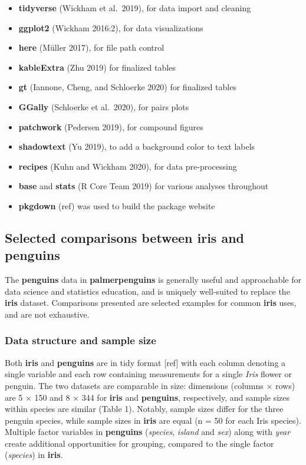 \begin{itemize}
\tightlist
\item
  \textbf{tidyverse} (Wickham et al.~2019), for data import and cleaning
\item
  \textbf{ggplot2} (Wickham 2016:2), for data visualizations
\item
  \textbf{here} (Müller 2017), for file path control
\item
  \textbf{kableExtra} (Zhu 2019) for finalized tables
\item
  \textbf{gt} (Iannone, Cheng, and Schloerke 2020) for finalized tables
\item
  \textbf{GGally} (Schloerke et al.~2020), for pairs plots
\item
  \textbf{patchwork} (Pedersen 2019), for compound figures
\item
  \textbf{shadowtext} (Yu 2019), to add a background color to text labels
\item
  \textbf{recipes} (Kuhn and Wickham 2020), for data pre-processing
\item
  \textbf{base} and \textbf{stats} (R Core Team 2019) for various analyses throughout
\item
  \textbf{pkgdown} (ref) was used to build the package website
\end{itemize}

\hypertarget{selected-comparisons-between-iris-and-penguins}{%
\subsection{\texorpdfstring{Selected comparisons between \textbf{iris} and \textbf{penguins}}{Selected comparisons between iris and penguins}}\label{selected-comparisons-between-iris-and-penguins}}

The \textbf{penguins} data in \textbf{palmerpenguins} is generally useful and approachable for data science and statistics education, and is uniquely well-suited to replace the \textbf{iris} dataset. Comparisons presented are selected examples for common \textbf{iris} uses, and are not exhaustive.

\hypertarget{data-structure-and-sample-size}{%
\subsubsection{Data structure and sample size}\label{data-structure-and-sample-size}}

Both \textbf{iris} and \textbf{penguins} are in tidy format {[}ref{]} with each column denoting a single variable and each row containing measurements for a single \emph{Iris} flower or penguin. The two datasets are comparable in size: dimensions (columns × rows) are 5 × 150 and 8 × 344 for \textbf{iris} and \textbf{penguins}, respectively, and sample sizes within species are similar (Table 1). Notably, sample sizes differ for the three penguin species, while sample sizes in \textbf{iris} are equal (n = 50 for each Iris species). Multiple factor variables in \textbf{penguins} (\emph{species}, \emph{island} and \emph{sex}) along with \emph{year} create additional opportunities for grouping, compared to the single factor (\emph{species}) in \textbf{iris}.

